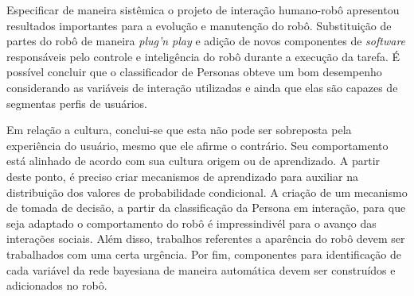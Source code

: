 Especificar de maneira sistêmica o projeto de interação humano-robô apresentou resultados importantes para a evolução e manutenção do robô. Substituição de partes do robô de maneira \emph{plug'n play} e adição de novos componentes de \emph{software} responsáveis pelo controle e inteligência do robô durante a execução da tarefa. É possível concluir que o classificador de Personas obteve um bom desempenho considerando as variáveis de interação utilizadas e ainda que elas são capazes de segmentas perfis de usuários.

Em relação a cultura, conclui-se que esta não pode ser sobreposta pela experiência do usuário, mesmo que ele afirme o contrário. Seu comportamento está alinhado de acordo com sua cultura origem ou de aprendizado. A partir deste ponto, é preciso criar mecanismos de aprendizado para auxiliar na distribuição dos valores de probabilidade condicional. A criação de um mecanismo de tomada de decisão, a partir da classificação da Persona em interação, para que seja adaptado o comportamento do robô é impressindivél para o avanço das interações sociais. Além disso, trabalhos referentes a aparência do robô devem ser trabalhados com uma certa urgência. Por fim, componentes para identificação de cada variável da rede bayesiana de maneira automática devem ser construídos e adicionados no robô.
